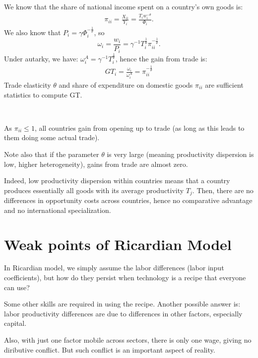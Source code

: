 We know that the share of national income spent on a country's own goods is:
\begin{gather*}
    \pi_{ii} = \frac{X_{ii}}{Y_i} = \frac{T_i w_i^{-\theta}}{\Phi_i}.
\end{gather*}
We also know that $P_i = \gamma \Phi_i^{-\frac{1}{\theta}}$, so
\[
\omega_i = \frac{w_i}{P_i} = \gamma^{-1} T_i^{\frac{1}{\theta}} \pi_{ii}^{-\frac{1}{\theta}}. 
\]
Under autarky, we have: $\omega_i^A = \gamma^{-1} T_i^{\frac{1}{\theta}}$, hence the gain from trade is:
\begin{gather}
    GT_i = \frac{\omega_i}{\omega_i^A} = \pi_{ii}^{-\frac{1}{\theta}} \label{eq:EKgft}
\end{gather}
Trade elasticity $\theta$ and share of expenditure on domestic goods $\pi_{ii} $ are sufficient statistics to compute GT.

\begin{intuition}
    \

    As $\pi_{ii} \leq 1$, all countries gain from opening up to trade (as long as this leads to them doing some actual trade).

    Note also that if the parameter $\theta$ is very large (meaning productivity dispersion is low, higher heterogeneity), 
    gains from trade are almost zero.

    Indeed, low productivity dispersion within countries means that a country produces essentially all goods with its average productivity $T_j$.
    Then, there are no differences in opportunity costs across countries, 
    hence no comparative advantage and no international specialization.
\end{intuition}

\section{Weak points of Ricardian Model}

In Ricardian model, we simply assume the labor differences (labor input coefficients), 
but how do they persist when technology is a recipe that everyone can use?

Some other skills are required in using the recipe. Another possible answer is:
labor productivity differences are due to differences in other factors, especially capital.

Also, with just one factor mobile across sectors, there is only one wage, giving no diributive conflict.
But such conflict is an important aspect of reality.
